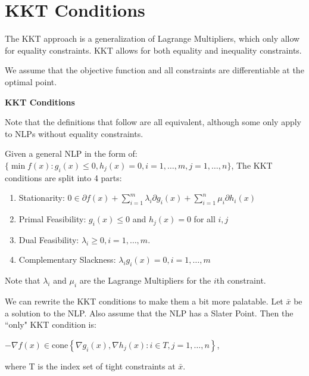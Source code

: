 \documentclass[a4paper]{report}
\begin{document}
	\section{KKT Conditions}
	The KKT approach is a generalization of Lagrange Multipliers, which only allow
	for equality constraints. KKT allows for both equality and inequality constraints.
	\begin{note}
		We assume that the objective function and all constraints are differentiable
		at the optimal point.
	\end{note}
	\begin{definition*}
		\textbf{KKT Conditions} \\ \item Note that the definitions that follow are
		all equivalent, although some only apply to NLPs without equality constraints.
		\item
		\begin{definition}
			\label{kkt} Given a general NLP in the form of: \\
			$\{\min f(x) : g_{i}(x) \leq 0, h_{j}(x) = 0, i = 1, \dots, m, j = 1, \dots
			, n\}$, The KKT conditions are split into 4 parts:
			\begin{enumerate}
				\item Stationarity:
					$0 \in \partial f(x) + \sum_{i=1}^{m} \lambda_{i} \partial g_{i}(x) + \sum
					_{i=1}^{n} \mu_{i} \partial h_{i}(x)$

				\item Primal Feasibility: $g_{i}(x) \leq 0$ and $h_{j}(x) = 0$ for all
					$i,j$

				\item Dual Feasibility: $\lambda_{i} \geq 0, i = 1, \dots, m$.

				\item Complementary Slackness:
					$\lambda_{i} g_{i}(x) = 0, i = 1, \dots, m$
			\end{enumerate}

			Note that $\lambda_{i}$ and $\mu_{i}$ are the Lagrange Multipliers for the
			$i$th constraint.
		\end{definition}


		\item
		\begin{definition}
			\label{kkt2} We can rewrite the KKT conditions to make them a bit more palatable.
			Let $\bar x$ be a solution to the NLP. Also assume that the NLP has a Slater
			Point. Then the ``only" KKT condition is:
			\begin{center}
				$-\nabla f(x) \in \text{cone}\left\{ \nabla g_{i}(x), \nabla h_{j}(x) : i
				\in T, j = 1, \dots, n \right\}$,
			\end{center}
			where T is the index set of tight constraints at $\bar x$.
		\end{definition}


\end{definition*}
\end{document}
